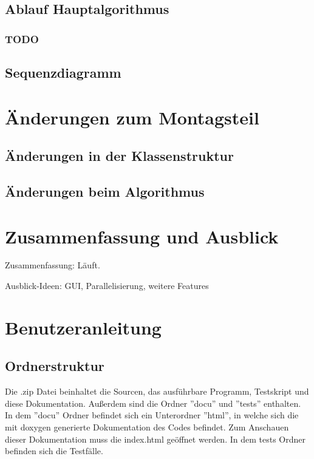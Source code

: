 \documentclass[a4paper,11pt]{article}
\begin{document}
{\subsection{Ablauf Hauptalgorithmus}

\subsubsection{TODO}

\subsection{Sequenzdiagramm}

\section{\"Anderungen zum Montagsteil}

\subsection{\"Anderungen in der Klassenstruktur}

\subsection{\"Anderungen beim Algorithmus}

\section{Zusammenfassung und Ausblick}

Zusammenfassung: Läuft.

Ausblick-Ideen: GUI, Parallelisierung, weitere Features


\section{Benutzeranleitung}
\subsection{Ordnerstruktur}
Die .zip Datei beinhaltet die Sourcen, das ausf\"uhrbare Programm, Testskript und diese Dokumentation. Außerdem sind die Ordner ''docu'' und ''tests'' enthalten. In dem ''docu'' Ordner befindet sich ein Unterordner ''html'', in welche sich die mit doxygen generierte Dokumentation des Codes befindet. Zum Anschauen dieser Dokumentation muss die index.html ge\"offnet werden. In dem tests Ordner befinden sich die Testf\"alle.
}
\end{document}
